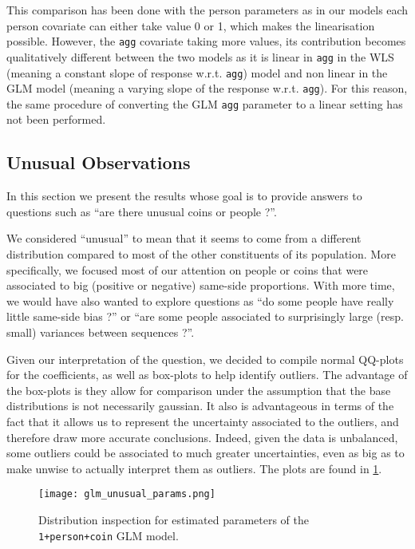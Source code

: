 \documentclass[a4paper, 12pt,oneside]{article}
\begin{document}
			This comparison has been done with the person parameters as in our models each person covariate can either take value 0 or 1, which makes the linearisation possible. However, the \texttt{agg} covariate taking more values, its contribution becomes qualitatively different between the two models as it is linear in \texttt{agg} in the WLS (meaning a constant slope of response w.r.t. \texttt{agg}) model and non linear in the GLM model (meaning a varying slope of the response w.r.t. \texttt{agg}). For this reason, the same procedure of converting the GLM \texttt{agg} parameter to a linear setting has not been performed. 
		\subsection{Unusual Observations}
			In this section we present the results whose goal is to provide answers to questions such as ``are there unusual coins or people ?''. 

			We considered ``unusual'' to mean that it seems to come from a different distribution compared to most of the other constituents of its population. More specifically, we focused most of our attention on people or coins that were associated to big (positive or negative) same-side proportions.  
			With more time, we would have also wanted to explore questions as  ``do some people have really little same-side bias ?'' or ``are some people associated to surprisingly large (resp. small) variances between sequences ?''.

			Given our interpretation of the question, we decided to compile normal QQ-plots for the coefficients, as well as box-plots to help identify outliers. The advantage of the box-plots is they allow for comparison under the assumption that the base distributions is not necessarily gaussian. 
			It also is advantageous in terms of the fact that it allows us to represent the uncertainty associated to the outliers, and therefore draw more accurate conclusions. Indeed, given the data is unbalanced, some outliers could be associated to much greater uncertainties, even as big as to make unwise to actually interpret them as outliers. 
			The plots are found in \ref{fig:unusual-params}. 
			\begin{figure}[h!]
				\centering
				\texttt{[image: glm\_unusual\_params.png]}
				\caption{Distribution inspection for estimated parameters of the \texttt{1+person+coin} GLM model.}
				\label{fig:unusual-params}
			\end{figure}
\end{document}
